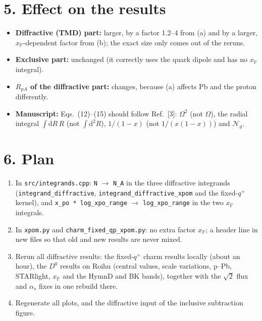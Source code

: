 \documentclass[12pt]{article}
\newcommand{\xpo}{x_{\mathbb{P}}}
\begin{document}
\section*{5. Effect on the results}

\begin{itemize}
\item \textbf{Diffractive (TMD) part:} larger, by a factor 1.2--4 from (a) and by a larger,
  $\xpo$-dependent factor from (b); the exact size only comes out of the reruns.
\item \textbf{Exclusive part:} unchanged (it correctly uses the quark dipole and has no $\xpo$
  integral).
\item \textbf{$R_{pA}$ of the diffractive part:} changes, because (a) affects Pb and the proton
  differently.
\item \textbf{Manuscript:} Eqs.~(12)--(15) should follow Ref.~[3]: $\Omega^2$ (not $\Omega$), the radial
  integral $\int\mathrm{d}R\,R$ (not $\int\mathrm{d}^2R$), $1/(1-x)$ (not $1/(x(1-x))$) and
  $\mathcal{N}_g$.
\end{itemize}

\section*{6. Plan}

\begin{enumerate}
\item In \texttt{src/integrands.cpp}: \texttt{N} $\to$ \texttt{N\_A} in the three diffractive
  integrands (\texttt{integrand\_diffractive}, \texttt{integrand\_diffractive\_xpom} and the fixed-$q^+$
  kernel), and \texttt{x\_po * log\_xpo\_range} $\to$ \texttt{log\_xpo\_range} in the two $\xpo$
  integrals.
\item In \texttt{xpom.py} and \texttt{charm\_fixed\_qp\_xpom.py}: no extra factor $\xpo$; a header
  line in new files so that old and new results are never mixed.
\item Rerun all diffractive results: the fixed-$q^+$ charm results locally (about an hour), the
  $D^0$ results on Roihu (central values, scale variations, p--Pb, STARlight, $\xpo$ and the HymnD and
  BK bands), together with the $\sqrt2$ flux and $\alpha_s$ fixes in one rebuild there.
\item Regenerate all plots, and the diffractive input of the inclusive subtraction figure.
\end{enumerate}
\end{document}
